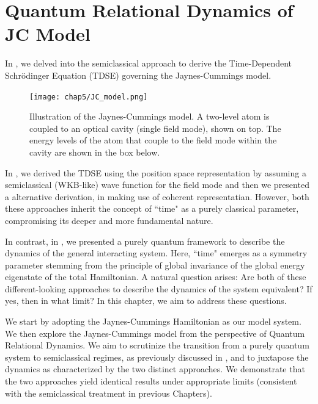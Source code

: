 \chapter{Quantum Relational Dynamics of JC Model
\label{chap5:RDQ_JCM_chap}}

In , we delved into the semiclassical approach to derive the Time-Dependent Schrödinger 
Equation (TDSE) governing the Jaynes-Cummings model. 
\begin{figure}[!h]
    \centering
    \texttt{[image: chap5/JC\_model.png]}
    \caption{Illustration of the Jaynes-Cummings model. A two-level atom is coupled to an optical cavity (single field mode), shown on top. The energy levels of the atom that couple to the field mode within the cavity are shown in the box below.}
    \label{fig:JC_illusttration}
\end{figure}
In , we derived the TDSE using the position space representation by assuming a semiclassical (WKB-like) wave function for the field mode and then 
we presented a alternative derivation, in  making use of coherent representatian.
However,  both these approaches inherit the concept of ``time" as a purely classical parameter, compromising its deeper and more fundamental nature.

In contrast, in , we presented a purely quantum framework to describe the dynamics of the general interacting system. Here, ``time" emerges as a symmetry parameter stemming from the principle of global invariance of the global energy eigenstate of the total Hamiltonian. A natural question arises: Are both of these different-looking approaches to describe the dynamics of the system equivalent? If yes, then in what limit? In this chapter, we aim to address these questions.

We start by adopting the Jaynes-Cummings Hamiltonian as our model system. We then explore the Jaynes-Cummings model from the perspective of Quantum Relational Dynamics. 
We aim to scrutinize the transition from a purely quantum system to semiclassical regimes,  as previously discussed in , and to juxtapose the dynamics as characterized by the two distinct approaches. We demonstrate that the two approaches yield identical results under appropriate limits (consistent with the semiclassical treatment in previous Chapters). 

